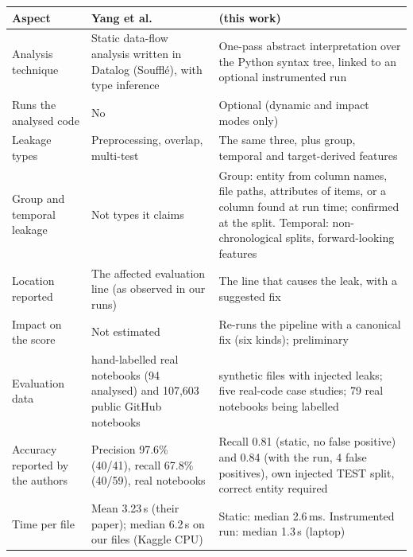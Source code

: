 \begin{tabularx}{\textwidth}{@{}>{\raggedright\arraybackslash}p{}>{\raggedright\arraybackslash}X>{\raggedright\arraybackslash}X@{}}
\toprule
\textbf{Aspect} & \textbf{Yang et al.~\cite{yang2022}} & \textbf{\tool{} (this work)} \\
\midrule
Analysis technique & Static data-flow analysis written in Datalog (Souffl\'{e}), with type inference & One-pass abstract interpretation over the Python syntax tree, linked to an optional instrumented run \\
Runs the analysed code & No & Optional (dynamic and impact modes only) \\
Leakage types & Preprocessing, overlap, multi-test & The same three, plus group, temporal and target-derived features \\
Group and temporal leakage & Not types it claims & Group: entity from column names, file paths, attributes of items, or a column found at run time; confirmed at the split. Temporal: non-chronological splits, forward-looking features \\
Location reported & The affected evaluation line (as observed in our runs) & The line that causes the leak, with a suggested fix \\
Impact on the score & Not estimated & Re-runs the pipeline with a canonical fix (six kinds); preliminary \\
Evaluation data & 100 hand-labelled real notebooks (94 analysed) and 107,603 public GitHub notebooks & 175 synthetic files with injected leaks; five real-code case studies; 79 real notebooks being labelled \\
Accuracy reported by the authors & Precision 97.6\% (40/41), recall 67.8\% (40/59), real notebooks & Recall 0.81 (static, no false positive) and 0.84 (with the run, 4 false positives), own injected TEST split, correct entity required \\
Time per file & Mean 3.23\,s (their paper); median 6.2\,s on our files (Kaggle CPU) & Static: median 2.6\,ms. Instrumented run: median 1.3\,s (laptop) \\
\bottomrule
\end{tabularx}
